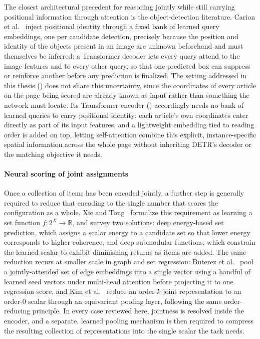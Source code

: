 The closest architectural precedent for reasoning jointly while still carrying positional information through attention is the object-detection literature. Carion et al.~\cite{carion-detr-2020} inject positional identity through a fixed bank of learned query embeddings, one per candidate detection, precisely because the position and identity of the objects present in an image are unknown beforehand and must themselves be inferred; a Transformer decoder lets every query attend to the image features and to every other query, so that one predicted box can suppress or reinforce another before any prediction is finalized. The setting addressed in this thesis () does not share this uncertainty, since the coordinates of every article on the page being scored are already known as input rather than something the network must locate. Its Transformer encoder () accordingly needs no bank of learned queries to carry positional identity: each article's own coordinates enter directly as part of its input features, and a lightweight embedding tied to reading order is added on top, letting self-attention combine this explicit, instance-specific spatial information across the whole page without inheriting DETR's decoder or the matching objective it needs.

\paragraph*{Neural scoring of joint assignments}
Once a collection of items has been encoded jointly, a further step is generally required to reduce that encoding to the single number that scores the configuration as a whole. Xie and Tong~\cite{xie-set-function-survey-2025} formalize this requirement as learning a set function $f: 2^X \to \mathbb{R}$, and survey two solutions: deep energy-based set prediction, which assigns a scalar energy to a candidate set so that lower energy corresponds to higher coherence, and deep submodular functions, which constrain the learned scalar to exhibit diminishing returns as items are added. The same reduction recurs at smaller scale in graph and set regression: Buterez et al.~\cite{buterez-edge-set-attention-2024} pool a jointly-attended set of edge embeddings into a single vector using a handful of learned seed vectors under multi-head attention before projecting it to one regression score, and Kim et al.~\cite{kim-transformers-deepsets-2021} reduce an order-$k$ joint representation to an order-$0$ scalar through an equivariant pooling layer, following the same order-reducing principle. In every case reviewed here, jointness is resolved inside the encoder, and a separate, learned pooling mechanism is then required to compress the resulting collection of representations into the single scalar the task needs.

